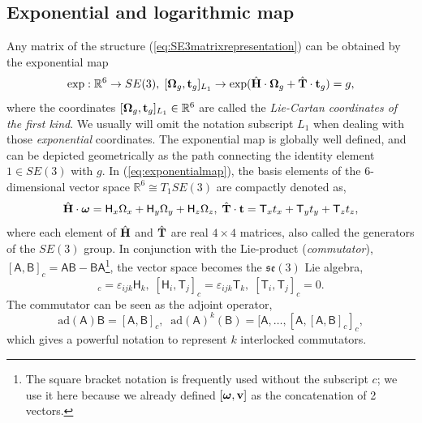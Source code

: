 \documentclass[journal]{IEEEtran}
\newcommand{\real}{\mathbb{R}}
\newcommand{\bfomega}{\boldsymbol{\omega}}
\newcommand{\bfOmega}{\boldsymbol{\Omega}}
\newcommand{\adj}[1]{\mathrm{ad}({#1})}
\newcommand{\beq}{\begin{equation}}
\newcommand{\eeq}{\end{equation}}
\begin{document}
\subsection{Exponential and logarithmic map}
\label{app:expmap}
Any matrix of the structure (\ref{eq:SE3matrixrepresentation}) can be obtained
by the exponential map
\beq
    \exp: \real^6 \rightarrow SE(3),\;
    [\bfOmega_g, {\bf t}_g]_{L_1} \rightarrow
    \exp( \hat{\bf H}\cdot\bfOmega_g + \hat{\bf T}\cdot{\bf t}_g ) = g,
    \label{eq:exponentialmap}
\eeq
where the coordinates $[\bfOmega_g,{\bf t}_g]_{L_1} \in \real^6$ are called the
{\em Lie-Cartan coordinates of the first kind}. We usually will omit the notation subscript
$L_1$ when dealing with those {\em exponential} coordinates. The exponential map is globally well defined,
and can be depicted geometrically as the path connecting the identity element $1\in SE(3)$ with
$g$. In (\ref{eq:exponentialmap}), the basis elements
of the 6-dimensional vector space $\real^6\cong T_1SE(3)$ are compactly denoted as,
\beq
    \hat{\bf H}\cdot\bfomega=\mathsf{H}_x\Omega_x+\mathsf{H}_y\Omega_y+\mathsf{H}_z\Omega_z,\;
    \hat{\bf T}\cdot{\bf t} =\mathsf{T}_x t_x + \mathsf{T}_y t_y + \mathsf{T}_z t_z,
    \label{eq:generatingmatrices}
\eeq
where each element of $\hat{\bf H}$ and $\hat{\bf T}$ are real $4\times 4$ matrices,
also called the generators of the $SE(3)$ group. In conjunction with the Lie-product
({\em commutator}), $[\mathsf{A},\mathsf{B}]_c = \mathsf{AB}-\mathsf{BA}$\footnote{The square bracket
notation is frequently used without the subscript $c$; we use it here because we already
defined $[{\bfomega},{\bf v}]$ as the concatenation of 2 vectors.},
the vector space becomes the $\mathfrak{se}(3)$ Lie algebra,
\beq
    [\mathsf{H}_i,\mathsf{H}_j]_c = \varepsilon_{ijk}\mathsf{H}_k,\;
    [\mathsf{H}_i,\mathsf{T}_j]_c = \varepsilon_{ijk}\mathsf{T}_k,\;
    [\mathsf{T}_i, \mathsf{T}_j]_c = 0. \label{eq:commutatortable}
\eeq
The commutator can be seen as the adjoint operator,
\beq
    \adj{\mathsf{A}} \mathsf{B} = [\mathsf{A},\mathsf{B}]_c, \;\;
    \adj{\mathsf{A}}^k(\mathsf{B}) = [\mathsf{A},\ldots,[\mathsf{A},[\mathsf{A},\mathsf{B}]_c]_c,
    \label{eq:defadjoint}
\eeq
which gives a powerful notation to represent $k$ interlocked commutators.
\end{document}
